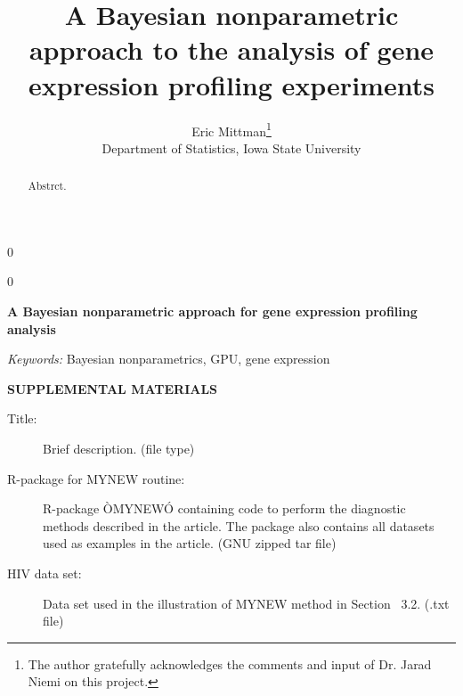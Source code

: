 \documentclass[12pt]{article}
\newcommand{\blind}{0}
\begin{document}
\newtoggle{thesis}
\togglefalse{thesis}

%

\def\spacingset#1{\renewcommand{\baselinestretch}%
{#1}\small\normalsize} \spacingset{1}
  
  
    
    \blind
  {
    \title{\bf A Bayesian nonparametric approach to the analysis of gene expression profiling experiments}
    \author{Eric Mittman\thanks{
      The author gratefully acknowledges the comments and input of Dr. Jarad Niemi on this project.}\hspace{.2cm}\\
      Department of Statistics, Iowa State University}
    \maketitle
  } \fi
  
  \blind
  {
    \bigskip
    \bigskip
    \bigskip
    \begin{center}
    {\LARGE\bf A Bayesian nonparametric approach for gene expression profiling analysis}
    \end{center}
    \medskip
  } \fi
  
  \bigskip
  \begin{abstract}
  Abstrct.
  \end{abstract}
  
  \noindent%
  {\it Keywords:}  Bayesian nonparametrics, GPU, gene expression 
  
  \spacingset{1.45}
  
  

  
  \bigskip
  \begin{center}
  {\large\bf SUPPLEMENTAL MATERIALS}
  \end{center}
  
  \begin{description}
  
  \item[Title:] Brief description. (file type)
  
  \item[R-package for  MYNEW routine:] R-package ÒMYNEWÓ containing code to perform the diagnostic methods described in the article. The package also contains all datasets used as examples in the article. (GNU zipped tar file)
  
  \item[HIV data set:] Data set used in the illustration of MYNEW method in Section~ 3.2. (.txt file)
  
  \end{description}
  
  
  
  
\end{document}
